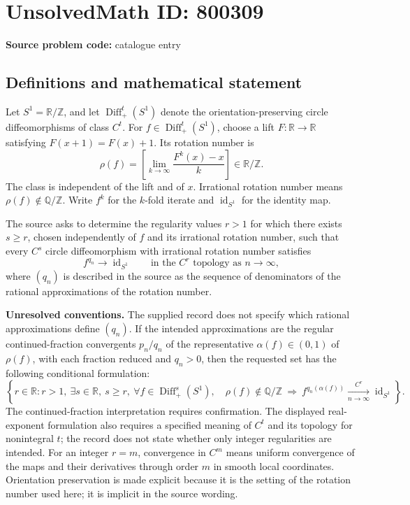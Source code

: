 \documentclass[11pt]{article}
\newcommand{\Z}{\mathbb{Z}}
\newcommand{\Q}{\mathbb{Q}}
\newcommand{\R}{\mathbb{R}}
\begin{document}
\section*{UnsolvedMath ID: 800309}
\textbf{Source problem code:} catalogue entry
\subsection{Definitions and mathematical statement}
Let \(S^1=\R/\Z\), and let \(\operatorname{Diff}^t_+(S^1)\) denote the orientation-preserving circle diffeomorphisms of class \(C^t\). For \(f\in\operatorname{Diff}^t_+(S^1)\), choose a lift \(F\colon\R\to\R\) satisfying \(F(x+1)=F(x)+1\). Its rotation number is
\[
\rho(f)=\left[\lim_{k\to\infty}\frac{F^k(x)-x}{k}\right]\in\R/\Z.
\]
The class is independent of the lift and of \(x\). Irrational rotation number means \(\rho(f)\notin\Q/\Z\). Write \(f^k\) for the \(k\)-fold iterate and \(\operatorname{id}_{S^1}\) for the identity map.

The source asks to determine the regularity values \(r>1\) for which there exists \(s\ge r\), chosen independently of \(f\) and its irrational rotation number, such that every \(C^s\) circle diffeomorphism with irrational rotation number satisfies
\[
 f^{q_n}\longrightarrow\operatorname{id}_{S^1}
 \qquad\text{in the }C^r\text{ topology as }n\to\infty,
\]
where \((q_n)\) is described in the source as the sequence of denominators of the rational approximations of the rotation number.

\textbf{Unresolved conventions.} The supplied record does not specify which rational approximations define \((q_n)\). If the intended approximations are the regular continued-fraction convergents \(p_n/q_n\) of the representative \(\alpha(f)\in(0,1)\) of \(\rho(f)\), with each fraction reduced and \(q_n>0\), then the requested set has the following conditional formulation:
\[
\left\{r\in\R:r>1,\ \exists s\in\R,\ s\ge r,\ 
\forall f\in\operatorname{Diff}^s_+(S^1),\quad
\rho(f)\notin\Q/\Z\ \Longrightarrow\ 
f^{q_n(\alpha(f))}\xrightarrow[n\to\infty]{C^r}\operatorname{id}_{S^1}
\right\}.
\]
The continued-fraction interpretation requires confirmation. The displayed real-exponent formulation also requires a specified meaning of \(C^t\) and its topology for nonintegral \(t\); the record does not state whether only integer regularities are intended. For an integer \(r=m\), convergence in \(C^m\) means uniform convergence of the maps and their derivatives through order \(m\) in smooth local coordinates. Orientation preservation is made explicit because it is the setting of the rotation number used here; it is implicit in the source wording.
\end{document}
